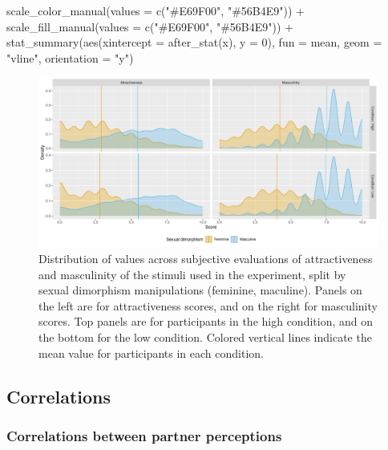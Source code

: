 \documentclass[
  bookmarksnumbered]{article}
\newenvironment{Shaded}{\begin{snugshade}}{\end{snugshade}}
\newcommand{\AttributeTok}[1]{\textcolor[rgb]{0.80,0.80,0.80}{#1}}
\newcommand{\DecValTok}[1]{\textcolor[rgb]{0.86,0.86,0.80}{#1}}
\newcommand{\FunctionTok}[1]{\textcolor[rgb]{0.94,0.94,0.56}{#1}}
\newcommand{\NormalTok}[1]{\textcolor[rgb]{0.80,0.80,0.80}{#1}}
\newcommand{\SpecialCharTok}[1]{\textcolor[rgb]{0.86,0.64,0.64}{#1}}
\newcommand{\StringTok}[1]{\textcolor[rgb]{0.80,0.58,0.58}{#1}}
\begin{document}
\begin{Shaded}
\begin{Highlighting}[]
  \FunctionTok{scale\_color\_manual}\NormalTok{(}\AttributeTok{values =} \FunctionTok{c}\NormalTok{(}\StringTok{"\#E69F00"}\NormalTok{, }\StringTok{"\#56B4E9"}\NormalTok{)) }\SpecialCharTok{+}
  \FunctionTok{scale\_fill\_manual}\NormalTok{(}\AttributeTok{values =} \FunctionTok{c}\NormalTok{(}\StringTok{"\#E69F00"}\NormalTok{, }\StringTok{"\#56B4E9"}\NormalTok{)) }\SpecialCharTok{+}
  \FunctionTok{stat\_summary}\NormalTok{(}\FunctionTok{aes}\NormalTok{(}\AttributeTok{xintercept =} \FunctionTok{after\_stat}\NormalTok{(x), }\AttributeTok{y =} \DecValTok{0}\NormalTok{),}
               \AttributeTok{fun =}\NormalTok{ mean, }\AttributeTok{geom =} \StringTok{"vline"}\NormalTok{, }\AttributeTok{orientation =} \StringTok{"y"}\NormalTok{)}
\end{Highlighting}
\end{Shaded}

\begin{figure}
\centering
\includegraphics{Supplementary_material_files/figure-latex/stimuli-eval-desc-plot-1.pdf}
\caption{\label{fig:stimuli-eval-desc-plot}Distribution of values across subjective evaluations of attractiveness and masculinity of the stimuli used in the experiment, split by sexual dimorphism manipulations (feminine, maculine). Panels on the left are for attractiveness scores, and on the right for masculinity scores. Top panels are for participants in the high condition, and on the bottom for the low condition. Colored vertical lines indicate the mean value for participants in each condition.}
\end{figure}

\subsection{Correlations}\label{correlations}

\subsubsection{Correlations between partner perceptions}\label{correlations-between-partner-perceptions}
\end{document}
